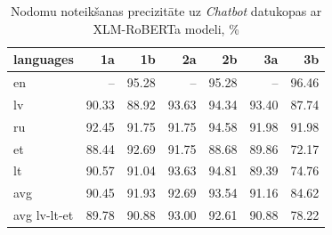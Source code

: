 \begin{table}[htbp]
  \centering
  \caption{Nodomu noteikšanas precizitāte uz \textit{Chatbot} datukopas ar XLM-RoBERTa modeli, \%}
    \begin{tabular}{lrrrrrr} \toprule
    languages & 1a & 1b & 2a & 2b & 3a & 3b \\\midrule
    en    &   --    & \cellcolor[rgb]{ .514,  .655,  .835}95.28 &   --    & \cellcolor[rgb]{ .514,  .655,  .835}95.28 &  --   & \cellcolor[rgb]{ .353,  .541,  .776}96.46 \\
    lv    & \cellcolor[rgb]{ .984,  .945,  .957}90.33 & \cellcolor[rgb]{ .984,  .902,  .914}88.92 & \cellcolor[rgb]{ .737,  .812,  .914}93.63 & \cellcolor[rgb]{ .639,  .745,  .878}94.34 & \cellcolor[rgb]{ .769,  .835,  .925}93.40 & \cellcolor[rgb]{ .984,  .867,  .878}87.74 \\
    ru    & \cellcolor[rgb]{ .894,  .922,  .969}92.45 & \cellcolor[rgb]{ .988,  .988,  1}91.75 & \cellcolor[rgb]{ .988,  .988,  1}91.75 & \cellcolor[rgb]{ .608,  .722,  .867}94.58 & \cellcolor[rgb]{ .957,  .969,  .992}91.98 & \cellcolor[rgb]{ .957,  .969,  .992}91.98 \\
    et    & \cellcolor[rgb]{ .984,  .89,  .902}88.44 & \cellcolor[rgb]{ .863,  .902,  .957}92.69 & \cellcolor[rgb]{ .988,  .988,  1}91.75 & \cellcolor[rgb]{ .984,  .894,  .906}88.68 & \cellcolor[rgb]{ .984,  .929,  .941}89.86 & \cellcolor[rgb]{ .973,  .412,  .42}72.17 \\
    lt    & \cellcolor[rgb]{ .984,  .953,  .965}90.57 & \cellcolor[rgb]{ .984,  .965,  .976}91.04 & \cellcolor[rgb]{ .737,  .812,  .914}93.63 & \cellcolor[rgb]{ .576,  .698,  .855}94.81 & \cellcolor[rgb]{ .984,  .918,  .929}89.39 & \cellcolor[rgb]{ .973,  .486,  .494}74.76 \\\midrule
    avg   & \cellcolor[rgb]{ .984,  .949,  .961}90.45 & \cellcolor[rgb]{ .965,  .973,  .992}91.93 & \cellcolor[rgb]{ .863,  .902,  .957}92.69 & \cellcolor[rgb]{ .749,  .82,  .918}93.54 & \cellcolor[rgb]{ .984,  .969,  .98}91.16 & \cellcolor[rgb]{ .98,  .776,  .788}84.62 \\
    avg lv-lt-et & \cellcolor[rgb]{ .984,  .929,  .941}89.78 & \cellcolor[rgb]{ .984,  .961,  .973}90.88 & \cellcolor[rgb]{ .82,  .871,  .941}93.00 & \cellcolor[rgb]{ .875,  .91,  .961}92.61 & \cellcolor[rgb]{ .984,  .961,  .973}90.88 & \cellcolor[rgb]{ .976,  .588,  .596}78.22 \\\bottomrule
    \end{tabular}%
  \label{tab:chatbot-xlm}%
\end{table}%



